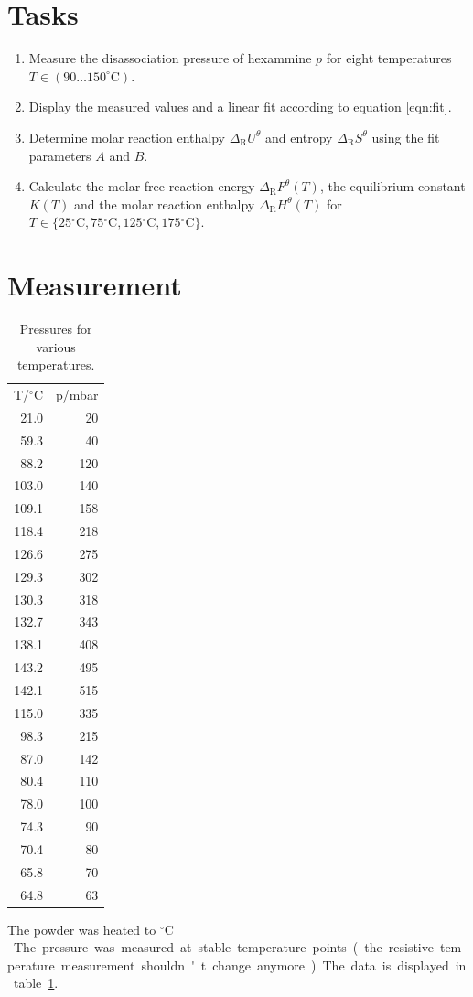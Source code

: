 \documentclass[english,twocolumn,DIV21,a4,10pt]{scrartcl}
\newcommand{\dr}{\Delta_\textrm{R}}
\newcommand{\dc}{{}^\circ\textrm{C}}
\begin{document}
\section{Tasks}
\begin{enumerate}
\item Measure the disassociation pressure of hexammine $p$ for eight
  temperatures $T\in (90\ldots150^\circ\textrm{C})$.
\item Display the measured values and a linear fit according to
  equation \eqref{eqn:fit}.
\item Determine molar reaction enthalpy $\dr U^\theta$ and entropy
  $\dr S^\theta$ using the fit parameters $A$ and $B$.
\item Calculate the molar free reaction energy $\dr F^\theta(T)$, the
  equilibrium constant $K(T)$ and the molar reaction enthalpy $\dr
  H^\theta(T)$ for $T\in\{25\dc,75\dc,125\dc,175\dc\}$.
\end{enumerate}

\section{Measurement}

  \begin{table}[htbp]
    \centering
    \begin{tabular}{rr}
 T/${}^\circ\textrm{C}$ & p/mbar\\
  21.0 &  20 \\
  59.3 &  40 \\
  88.2 & 120 \\
 103.0 & 140 \\
 109.1 & 158 \\
 118.4 & 218 \\
 126.6 & 275 \\
 129.3 & 302 \\
 130.3 & 318 \\
 132.7 & 343 \\
 138.1 & 408 \\
 143.2 & 495 \\
 142.1 & 515 \\
 115.0 & 335 \\
  98.3 & 215 \\
  87.0 & 142 \\
  80.4 & 110 \\
  78.0 & 100 \\
  74.3 &  90 \\
  70.4 &  80 \\
  65.8 &  70 \\
  64.8 &  63 \\
    \end{tabular}
    \caption{Pressures for various temperatures.}
    \label{tab:meas}
  \end{table}
  The powder was heated to \unit[140]{${}^\circ\textrm{C}$}.  The
  pressure was measured at stable temperature points (the resistive
  temperature measurement shouldn't change anymore). The data is
  displayed in table \ref{tab:meas}.
\end{document}

